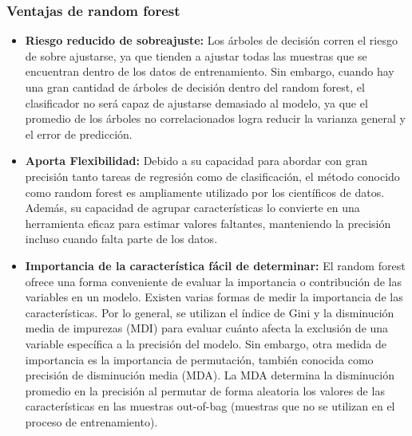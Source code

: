 \subsubsection{Ventajas de random forest}
\begin{itemize}
    \item \textbf{Riesgo reducido de sobreajuste:} Los árboles de decisión corren el riesgo de sobre ajustarse, ya que tienden a ajustar todas las muestras que se encuentran dentro de los datos de entrenamiento. Sin embargo, cuando hay una gran cantidad de árboles de decisión dentro del random forest, el clasificador no será capaz de ajustarse demasiado al modelo, ya que el promedio de los árboles no correlacionados logra reducir la varianza general y el error de predicción.
    \item \textbf{Aporta Flexibilidad:} Debido a su capacidad para abordar con gran precisión tanto tareas de regresión como de clasificación, el método conocido como random forest es ampliamente utilizado por los científicos de datos. Además, su capacidad de agrupar características lo convierte en una herramienta eficaz para estimar valores faltantes, manteniendo la precisión incluso cuando falta parte de los datos.
    \item \textbf{Importancia de la característica fácil de determinar:} El random forest ofrece una forma conveniente de evaluar la importancia o contribución de las variables en un modelo. Existen varias formas de medir la importancia de las características. Por lo general, se utilizan el índice de Gini y la disminución media de impurezas (MDI) para evaluar cuánto afecta la exclusión de una variable específica a la precisión del modelo.
    Sin embargo, otra medida de importancia es la importancia de permutación, también conocida como precisión de disminución media (MDA). La MDA determina la disminución promedio en la precisión al permutar de forma aleatoria los valores de las características en las muestras out-of-bag (muestras que no se utilizan en el proceso de entrenamiento).
\end{itemize}

